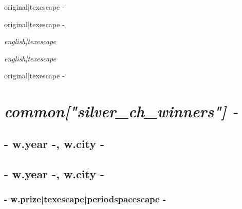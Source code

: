 {%

{%
{%
{\large {{ original|texescape -}} } 
{%
{%
\begin{addmargin}[-0.05em]{0em}{\large {{ original|texescape -}} }\end{addmargin}{\itshape {{ english|texescape }} }
{%
\begin{addmargin}[-0.05em]{0em}{\large{ } }\end{addmargin}{\itshape {{ english|texescape }} }
{%
{\large{ {{ original|texescape -}} } } 
{%
{%
{%

{%
{%
{%
{%
{%
{%
{%
{%
{%
{%

{%
\chapter*{\hfill{\slshape {{ common["silver_ch_winners"] -}} } }
\thispagestyle{empty}
\vspace{70pt}
{%
{%
    \section*{ {{- w.year -}}, {{ w.city -}} }
{%
    \section*{ {{- w.year -}}, {{ w.city -}} }
{%
{%
    {%
        \subsection*{ {{- w.prize|texescape|periodspacescape -}} }
    {%
}}}}}}}}}}}}}}}}}}}}}}}}}}}}
